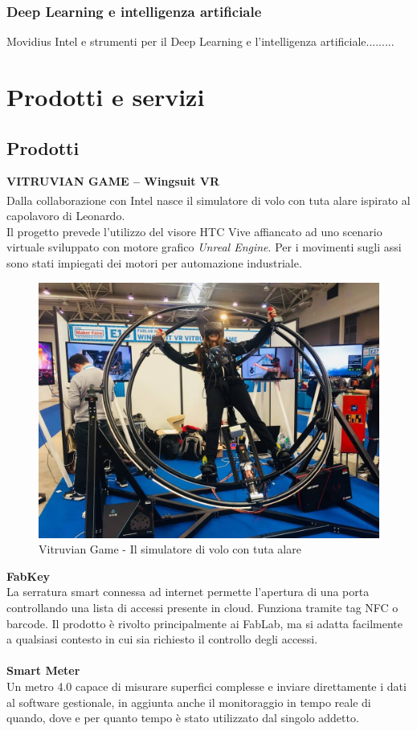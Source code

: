 \subsubsection{Deep Learning e intelligenza artificiale}
Movidius Intel e strumenti per il Deep Learning e l’intelligenza artificiale.........

\newpage
\section{Prodotti e servizi}
\subsection{Prodotti}
\textbf{VITRUVIAN GAME – Wingsuit VR}
\\
Dalla collaborazione con Intel\textsuperscript{\textregistered} nasce il simulatore di volo con tuta alare ispirato al capolavoro di Leonardo.\\
Il progetto prevede l'utilizzo del visore HTC Vive affiancato ad uno scenario virtuale sviluppato con motore grafico \textit{Unreal Engine}. Per i movimenti sugli assi sono stati impiegati dei motori per automazione industriale.
\\
\begin{figure}[H]
	\begin{center}
	\includegraphics[scale=0.15]{immagini/vitruvian.jpg}
	\caption{Vitruvian Game - Il simulatore di volo con tuta alare}
	\end{center}
\end{figure}

\noindent \textbf{FabKey}
\\
La serratura smart connessa ad internet permette l'apertura di una porta controllando una lista di accessi presente in cloud. Funziona tramite tag \gls{NFC} o barcode. Il prodotto è rivolto principalmente ai \gls{FabLab}, ma si adatta facilmente a qualsiasi contesto in cui sia richiesto il controllo degli accessi.
\\
\\
\textbf{Smart Meter}
\\
Un metro 4.0 capace di misurare superfici complesse e inviare direttamente i dati al software gestionale, in aggiunta anche il monitoraggio in tempo reale di quando, dove e per quanto tempo è stato utilizzato dal singolo addetto.

